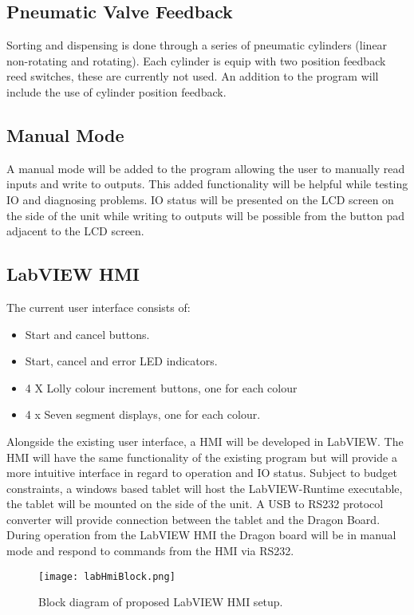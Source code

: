 \subsection{Pneumatic Valve Feedback}
    Sorting and dispensing is done through a series of pneumatic cylinders (linear non-rotating and rotating). Each cylinder is equip with two position feedback reed switches, these are currently not used. An addition to the program will include the use of cylinder position feedback. 
    
\subsection{Manual Mode}
    A manual mode will be added to the program allowing the user to manually read inputs and write to outputs. This added functionality will be helpful while testing IO and diagnosing problems. IO status will be presented on the LCD screen on the side of the unit while writing to outputs will be possible from the button pad adjacent to the LCD screen.
    
\subsection{LabVIEW HMI}
    The current user interface consists of: 
    \begin{itemize}
        \item Start and cancel buttons.
        \item Start, cancel and error LED indicators.
        \item 4 X Lolly colour increment buttons, one for each colour 
        \item 4 x Seven segment displays, one for each colour.
    \end{itemize}
    Alongside the existing user interface, a HMI will be developed in LabVIEW. The HMI will have the same functionality of the existing program but will provide a more intuitive interface in regard to operation and IO status. Subject to budget constraints, a windows based tablet will host the LabVIEW-Runtime executable, the tablet will be mounted on the side of the unit. A USB to RS232 protocol converter will provide connection between the tablet and the Dragon Board. During operation from the LabVIEW HMI the Dragon board will be in manual mode and respond to commands from the HMI via RS232.
    \\ \begin{figure}[ht]
        \centering
        \texttt{[image: labHmiBlock.png]}
        \caption{Block diagram of proposed LabVIEW HMI setup.}
        \label{fig:labHmiBlock}
    \end{figure}
    

